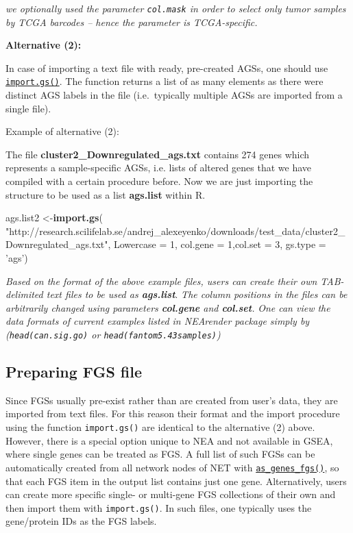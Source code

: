 \documentclass[]{article}
\newenvironment{Shaded}{\begin{snugshade}}{\end{snugshade}}
\newcommand{\KeywordTok}[1]{\textcolor[rgb]{0.13,0.29,0.53}{\textbf{#1}}}
\newcommand{\DataTypeTok}[1]{\textcolor[rgb]{0.13,0.29,0.53}{#1}}
\newcommand{\DecValTok}[1]{\textcolor[rgb]{0.00,0.00,0.81}{#1}}
\newcommand{\StringTok}[1]{\textcolor[rgb]{0.31,0.60,0.02}{#1}}
\newcommand{\NormalTok}[1]{#1}
\begin{document}
\emph{we optionally used the parameter \texttt{col.mask} in order to
select only tumor samples by TCGA barcodes -- hence the parameter is
TCGA-specific.}

\textbf{Alternative (2):}

In case of importing a text file with ready, pre-created AGSs, one
should use \protect\hyperlink{igs}{\texttt{import.gs()}}. The function
returns a list of as many elements as there were distinct AGS labels in
the file (i.e.~typically multiple AGSs are imported from a single file).

Example of alternative (2):

The file \textbf{cluster2\_Downregulated\_ags.txt} contains 274 genes
which represents a sample-specific AGSs, i.e. lists of altered genes
that we have compiled with a certain procedure before. Now we are just
importing the structure to be used as a list \textbf{ags.list} within R.

\begin{Shaded}
\begin{Highlighting}[]
\NormalTok{ags.list2 <-}\KeywordTok{import.gs}\NormalTok{(}
\StringTok{"http://research.scilifelab.se/andrej_alexeyenko/downloads/test_data/cluster2_Downregulated_ags.txt"}\NormalTok{, }
\DataTypeTok{Lowercase =} \DecValTok{1}\NormalTok{, }\DataTypeTok{col.gene =} \DecValTok{1}\NormalTok{,}\DataTypeTok{col.set =} \DecValTok{3}\NormalTok{, }\DataTypeTok{gs.type =} \StringTok{'ags'}\NormalTok{)}
\end{Highlighting}
\end{Shaded}

\emph{Based on the format of the above example files, users can create
their own TAB-delimited text files to be used as \textbf{ags.list}}.
\emph{The column positions in the files can be arbitrarily changed using
parameters \textbf{col.gene} and \textbf{col.set}.} \emph{One can view
the data formats of current examples listed in NEArender package simply
by (\texttt{head(can.sig.go)} or \texttt{head(fantom5.43samples)})}

\hypertarget{fgs}{\subsection{Preparing FGS file}\label{fgs}}

Since FGSs usually pre-exist rather than are created from user's data,
they are imported from text files. For this reason their format and the
import procedure using the function \texttt{import.gs()} are identical
to the alternative (2) above. However, there is a special option unique
to NEA and not available in GSEA, where single genes can be treated as
FGS. A full list of such FGSs can be automatically created from all
network nodes of NET with
\protect\hyperlink{misc}{\texttt{as\_genes\_fgs()}}, so that each FGS
item in the output list contains just one gene. Alternatively, users can
create more specific single- or multi-gene FGS collections of their own
and then import them with \texttt{import.gs()}. In such files, one
typically uses the gene/protein IDs as the FGS labels.
\end{document}
